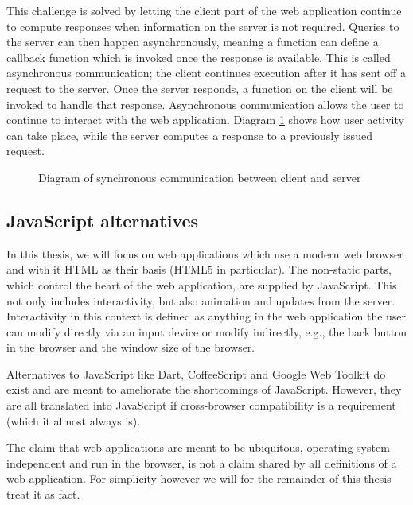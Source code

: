 \documentclass[thesis.tex]{subfiles}
\begin{document}
This challenge is solved by letting the client part of the web application
continue to compute responses when information on the server is not required.
Queries to the server can then happen asynchronously, meaning a function can
define a callback function which is invoked once the response is available. This
is called asynchronous communication; the client continues execution after it
has sent off a request to the server. Once the server responds, a function on
the client will be invoked to handle that response.
Asynchronous communication allows the user to continue to interact with the
web application. Diagram \ref{fig:asynchronous} shows how user activity can
take place, while the server computes a response to a previously issued request.

\begin{figure}
	\centering
	\resizebox{\linewidth}{!}{}
	\caption{Diagram of synchronous communication between client and server}
	\label{fig:asynchronous}
\end{figure}

\subsection{JavaScript alternatives}
\label{sec:javascript-alts}
In this thesis, we will focus on web applications which use a
modern web browser and with it HTML as their basis (HTML5 in particular).
The non-static parts, which control the heart of the web application,
are supplied by JavaScript. This not only includes interactivity, but also
animation and updates from the server.\\
Interactivity in this context is defined as anything in the web application
the user can modify directly via an input device or modify indirectly, e.g.,
the back button in the browser and the window size of the browser.

Alternatives to JavaScript like Dart, CoffeeScript and Google Web Toolkit
do exist and are meant to ameliorate the shortcomings of JavaScript. 
However, they are all translated into JavaScript if cross-browser
compatibility is a requirement (which it almost always is).

The claim that web applications are meant to be ubiquitous,
operating system independent and run in the browser, is not a claim shared
by all definitions of a web application. For simplicity however we will for the
remainder of this thesis treat it as fact.
\end{document}
